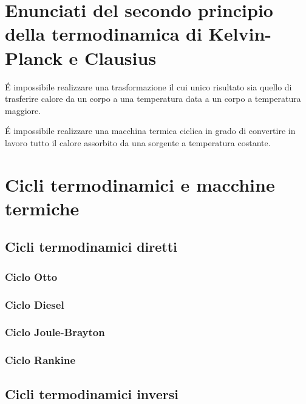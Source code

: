 \section{Enunciati del secondo principio della termodinamica di Kelvin-Planck e Clausius}
\begin{definition} \'E impossibile realizzare una trasformazione il cui unico risultato sia quello di trasferire calore da un corpo a una temperatura data a un corpo a temperatura maggiore.
\end{definition}
\begin{definition} \'E impossibile realizzare una macchina termica ciclica in grado di convertire in lavoro tutto il calore assorbito da una sorgente a temperatura costante.
\end{definition}

\section{Cicli termodinamici e macchine termiche}
\subsection{Cicli termodinamici diretti}
\subsubsection{Ciclo Otto}
\subsubsection{Ciclo Diesel}
\subsubsection{Ciclo Joule-Brayton}
\subsubsection{Ciclo Rankine}
\subsection{Cicli termodinamici inversi}


